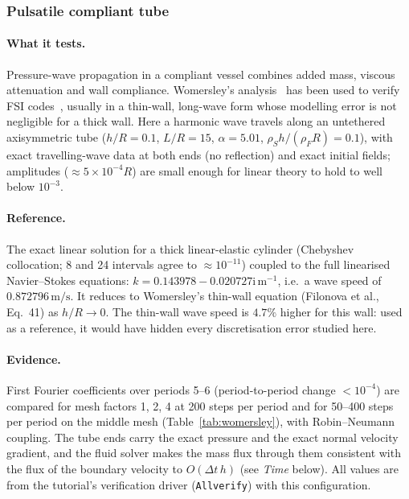 \subsubsection{Pulsatile compliant tube}\label{sec:womersley}

\paragraph{What it tests.}
Pressure-wave propagation in a compliant vessel combines added mass, viscous attenuation and wall compliance.
Womersley's analysis~\citep{Womersley1955, Womersley1957} has been used to verify FSI codes~\citep{Filonova2020}, usually in a thin-wall, long-wave form whose modelling error is not negligible for a thick wall.
Here a harmonic wave travels along an untethered axisymmetric tube ($h/R = 0.1$, $L/R = 15$, $\alpha = 5.01$, $\rho_S h/(\rho_F R) = 0.1$), with exact travelling-wave data at both ends (no reflection) and exact initial fields; amplitudes ($\approx5\times10^{-4}R$) are small enough for linear theory to hold to well below $10^{-3}$.

\paragraph{Reference.}
The exact linear solution for a thick linear-elastic cylinder (Chebyshev collocation; 8 and 24 intervals agree to $\approx10^{-11}$) coupled to the full linearised Navier--Stokes equations: $k = 0.143978 - 0.020727\mathrm{i}\,\mathrm{m^{-1}}$, i.e.\ a wave speed of $0.872796\,\mathrm{m/s}$.
It reduces to Womersley's thin-wall equation (Filonova et al., Eq.~41) as $h/R\to0$.
The thin-wall wave speed is $4.7\%$ higher for this wall: used as a reference, it would have hidden every discretisation error studied here.

\paragraph{Evidence.}
First Fourier coefficients over periods 5--6 (period-to-period change $<10^{-4}$) are compared for mesh factors 1, 2, 4 at 200 steps per period and for 50--400 steps per period on the middle mesh (Table~\ref{tab:womersley}), with Robin--Neumann coupling.
The tube ends carry the exact pressure and the exact normal velocity gradient, and the fluid solver makes the mass flux through them consistent with the flux of the boundary velocity to $O(\Delta t\,h)$ (see \emph{Time} below). All values are from the tutorial's verification driver (\texttt{Allverify}) with this configuration.


